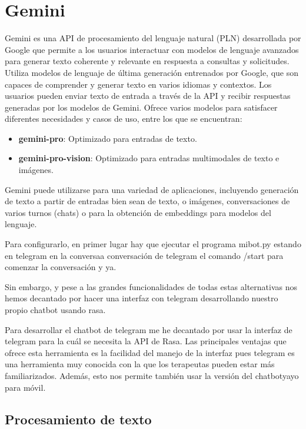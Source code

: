 \section{Gemini}
\label{sec:gemini}

Gemini es una API de procesamiento del lenguaje natural (PLN) desarrollada por Google que permite a los usuarios interactuar con modelos de lenguaje avanzados para generar texto coherente y relevante en respuesta a consultas y solicitudes. Utiliza modelos de lenguaje de última generación entrenados por Google, que son capaces de comprender y generar texto en varios idiomas y contextos. Los usuarios pueden enviar texto de entrada a través de la API y recibir respuestas generadas por los modelos de Gemini. Ofrece varios modelos para satisfacer diferentes necesidades y casos de uso, entre los que se encuentran:
\begin{itemize}[label=$\bullet$, leftmargin=*]
	\item \textbf{gemini-pro}: Optimizado para entradas de texto.
	\item \textbf{gemini-pro-vision}: Optimizado para entradas multimodales de texto e imágenes.
\end{itemize}

Gemini puede utilizarse para una variedad de aplicaciones, incluyendo generación de texto a partir de entradas bien sean de texto, o imágenes, conversaciones de varios turnos (chats) o para la obtención de embeddings para modelos del lenguaje. 

Para configurarlo, en primer lugar hay que ejecutar el programa mibot.py estando en telegram en la conversaa conversación de telegram el comando /start para comenzar la conversación y ya. 

Sin embargo, y pese a las grandes funcionalidades de todas estas alternativas nos hemos decantado por hacer una interfaz con telegram desarrollando nuestro propio chatbot usando rasa. 

Para desarrollar el chatbot de telegram me he decantado por usar la interfaz de telegram para la cuál se necesita la API de Rasa. Las principales ventajas que ofrece esta herramienta es la facilidad del manejo de la interfaz pues telegram es una herramienta muy conocida con la que los terapeutas pueden estar más familiarizados. Además, esto nos permite también usar la versión del chatbotyayo para móvil. 

\subsection{Procesamiento de texto}


